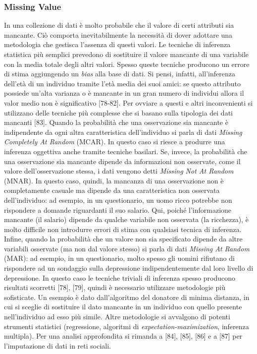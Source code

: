 \subsubsection{Missing Value}
In una collezione di dati \`e molto probabile che il valore di certi attributi sia mancante. Ci\`o comporta inevitabilmente la necessit\`a di dover adottare una metodologia che gestisca l'assenza di questi valori. Le tecniche di inferenza statistica pi\`u semplici prevedono di sostituire il valore mancante di una variabile con la media totale degli altri valori. Spesso queste tecniche producono un errore di stima aggiungendo un \textit{bias} alla base di dati. Si pensi, infatti, all'inferenza dell'et\`a di un individuo tramite l'et\`a media dei suoi amici: se questo attributo possiede un'alta varianza o \`e mancante in un gran numero di individui allora il valor medio non \`e significativo [78-82]. Per ovviare a questi e altri inconvenienti si utilizzano delle tecniche pi\`u complesse che si basano sulla tipologia dei dati mancanti [83]. Quando la probabilit\`a che una osservazione sia mancante \`e indipendente da ogni altra caratteristica dell'individuo si parla di dati \textit{Missing Completely At Random} (MCAR). In questo caso si riesce a produrre una inferenza oggettiva anche tramite tecniche basilari. Se, invece, la probabilit\`a che una osservazione sia mancante dipende da informazioni non osservate, come il valore dell'osservazione stessa, i dati vengono detti \textit{Missing Not At Random} (MNAR). In questo caso, quindi, la mancanza di una osservazione non \`e completamente casuale ma  dipende da una caratteristica non osservata dell'individuo: ad esempio, in un questionario, un uomo ricco potrebbe non rispondere a domande riguardanti il suo salario. Qui, poich\'e l'informazione mancante (il salario) dipende da qualche variabile non osservata (la ricchezza), \`e molto difficile non introdurre errori di stima con qualsiasi tecnica di inferenza. Infine, quando la probabilit\`a che un valore non sia specificato dipende da altre variabili osservate (ma non dal valore stesso) si parla di dati \textit{Missing At Random} (MAR): ad esempio, in un questionario, molto spesso gli uomini rifiutano di rispondere ad un sondaggio sulla depressione indipendentemente dal loro livello di depressione. In questo caso le tecniche triviali di inferenza spesso producono risultati scorretti [78], [79], quindi \`e necessario utilizzare metodologie pi\`u sofisticate. Un esempio \`e dato dall'algoritmo del donatore di minima distanza, in cui si sceglie di sostituire il dato mancante in un individuo con quello presente nell'individuo ad esso pi\`u simile.
Altre metodologie si avvalgono di potenti strumenti statistici (regressione, algoritmi di \textit{expectation-maximization}, inferenza multipla). Per una analisi approfondita si rimanda a [84], [85], [86] e a [87] per l'imputazione di dati in reti sociali.


